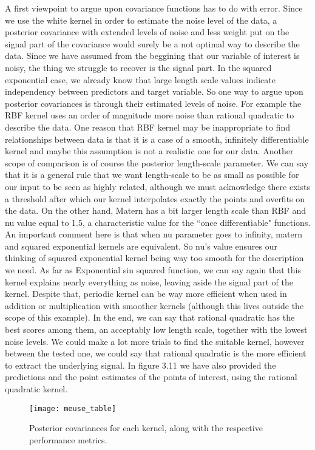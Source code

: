 \documentclass[12pt,a4paper,oneside]{book}
\theoremstyle{plain}
\theoremstyle{definition}
\begin{document}
{\newpage
\noindent
A first viewpoint to argue upon covariance functions has to do with error. Since we use the white kernel in order to estimate the noise level of the data, a posterior covariance with extended levels of noise and less weight put on the signal part of the covariance would surely be a not optimal way to describe the data. Since we have assumed from the beggining that our variable of interest is noisy, the thing we struggle to recover is the signal part. In the squared exponential case, we already know that large length scale values indicate independency between predictors and target variable. So one way to argue upon posterior covariances is through their estimated levels of noise. For example the RBF kernel uses an order of magnitude more noise than rational quadratic to describe the data. One reason that RBF kernel may be inappropriate to find relationships between data is that it is a case of a smooth, infinitely differentiable kernel and maybe this assumption is not a realistic one for our data. Another scope of comparison is of course the posterior length-scale parameter. We can say that it is a general rule that we want  length-scale to be as small as possible for our input to be seen as highly related, although we must acknowledge there exists a threshold after which our kernel interpolates exactly the points and overfits on the data. On the other hand, Matern has a bit larger length scale than RBF and nu value equal to 1.5, a characteristic value for the ``once differentiable" functions. An important comment here is that when nu parameter goes to infinity, matern and squared exponential kernels are equivalent. So nu's value ensures our thinking of squared exponential kernel being way too smooth for the description we need. As far as Exponential sin squared function, we can say again that this kernel explains nearly everything as noise, leaving aside the signal part of the kernel. Despite that, periodic kernel can be way more efficient when used in addition or multiplication with smoother kernels (although this lives outside the scope of this example). In the end, we can say that rational quadratic has the best scores among them, an acceptably low length scale, together with the lowest noise levels. We could make a lot more trials to find the suitable kernel, however between the tested one, we could say that rational quadratic is the more efficient to extract the underlying signal. In figure 3.11 we have also provided the predictions and the point estimates of the points of interest, using the rational quadratic kernel.   
\begin{figure}[h]
\begin{flushleft}
\texttt{[image: meuse\_table]}
\end{flushleft}
\caption{Posterior covariances for each kernel, along with the respective performance metrics.}
\end{figure}


}
\end{document}
